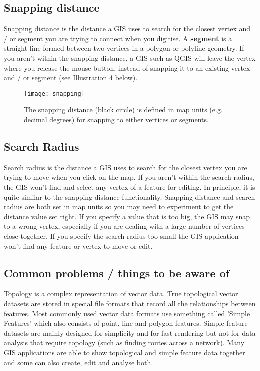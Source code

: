 \subsection{Snapping distance}

Snapping distance is the distance a GIS uses to search for the closest vertex
and / or segment you are trying to connect when you digitise. A
\textbf{segment} is a
straight line formed between two vertices in a polygon or polyline geometry.
If you aren't within the snapping distance, a GIS such as QGIS will leave the
vertex where you release the mouse button, instead of snapping it to an
existing vertex and / or segment (see Illustration 4 below).

\begin{figure}[ht]
   \begin{center}
   \caption{The snapping distance (black circle) is defined in map units
(e.g. decimal degrees) for snapping to either vertices or segments.}
\label{fig:snapping}\smallskip
   \texttt{[image: snapping]}
\end{center}
\end{figure}

\subsection{Search Radius}

Search radius is the distance a GIS uses to search for the closest vertex you
are trying to move when you click on the map. If you aren't within the search
radius, the GIS won't find and select any vertex of a feature for editing. In
principle, it is quite similar to the snapping distance functionality. 
Snapping distance and search radius are both set in map units so you may
need to experiment to get the distance value set right. If you specify a
value  that is too big, the GIS may snap to a wrong vertex, especially if you
are dealing with a large number of vertices close together. If you specify
the search radius too small the GIS application won't find any feature or
vertex to move or edit.

\subsection{Common problems / things to be aware of}

Topology is a complex representation of vector data. True topological vector
datasets are stored in special file formats that record all the relationships
between features. Most commonly used vector data formats use something called
'Simple Features' which also consists of point, line and polygon features.
Simple feature datasets are mainly designed for simplicity and for fast
rendering but not for data analysis that require topology (such as finding
routes across a network). Many GIS applications are able to show topological
and simple feature data together and some can also create, edit and analyse
both.

